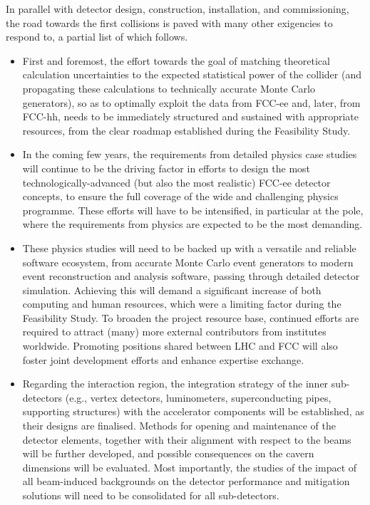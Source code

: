 In parallel with detector design, construction, installation, and commissioning, the road towards the first collisions is paved with many other exigencies to respond to, a partial list of which follows.  
\begin{itemize}
\item First and foremost, the effort towards the goal of matching theoretical calculation uncertainties to the expected statistical power of the collider (and propagating these calculations to technically accurate Monte Carlo generators), so as to optimally exploit the data from FCC-ee and, later, from FCC-hh, needs to be immediately structured and sustained with appropriate resources, from the clear roadmap established during the Feasibility Study. 

\item In the coming few years, the requirements from detailed physics case studies will continue to be the driving factor in efforts to design the most technologically-advanced (but also the most realistic) FCC-ee detector concepts, to ensure the full coverage of the wide and challenging physics programme. These efforts will have to be intensified, in particular at the \PZ pole, where the requirements from physics are expected to be the most demanding. 

\item These physics studies will need to be backed up with a versatile and reliable software ecosystem, from accurate Monte Carlo event generators to modern event reconstruction and analysis software, passing through detailed detector simulation. Achieving this will demand a significant increase of both computing and human resources, which were a limiting factor during the Feasibility Study. To broaden the project resource base, continued efforts are required to attract (many) more external contributors from institutes worldwide. Promoting positions shared between LHC and FCC will also foster joint development efforts and enhance expertise exchange. 

\item Regarding the interaction region, the integration strategy of the inner sub-detectors (e.g., vertex detectors, luminometers, superconducting pipes, supporting structures) with the accelerator components will be established, as their designs are finalised.   
Methods for opening and maintenance of the detector elements, together with their alignment with respect to the beams will be further developed, and possible consequences on the cavern dimensions will be evaluated. Most importantly, the studies of the impact of all beam-induced backgrounds on the detector performance and mitigation solutions will need to be consolidated for all sub-detectors.


\end{itemize}
